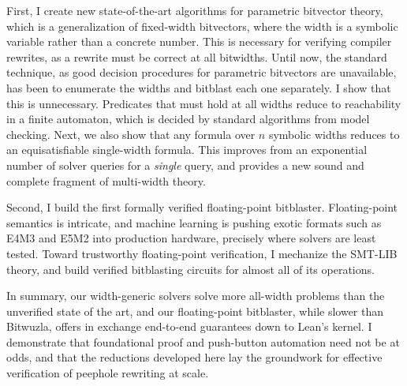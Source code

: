 First, I create new state-of-the-art algorithms for parametric bitvector theory,
which is a generalization of fixed-width bitvectors, where the width is a symbolic variable rather than a concrete number.
This is necessary for verifying compiler rewrites, as a rewrite must be correct at all bitwidths.
Until now, the standard technique, as good decision procedures for parametric bitvectors are unavailable,
has been to enumerate the widths and bitblast each one separately.
I show that this is unnecessary.
Predicates that must hold at all widths reduce to reachability in a finite automaton, which is decided by standard algorithms from model checking.
Next, we also show that any formula over $n$ symbolic widths reduces to an equisatisfiable single-width formula.
This improves from an exponential number of solver queries for a \emph{single} query,
and provides a new sound and complete fragment of multi-width theory.

Second, I build the first formally verified floating-point bitblaster.
Floating-point semantics is intricate, and machine learning is pushing exotic formats such as E4M3 and E5M2 into production hardware,
precisely where solvers are least tested.
Toward trustworthy floating-point verification, I mechanize the SMT-LIB \qffp{} theory,
and build verified bitblasting circuits for almost all of its operations.

In summary, our width-generic solvers solve more all-width problems than the unverified state of the art,
and our floating-point bitblaster, while slower than Bitwuzla,
offers in exchange end-to-end guarantees down to Lean's kernel.
I demonstrate that foundational proof and push-button automation need not be at odds,
and that the reductions developed here lay the groundwork for effective verification of peephole rewriting at scale.
